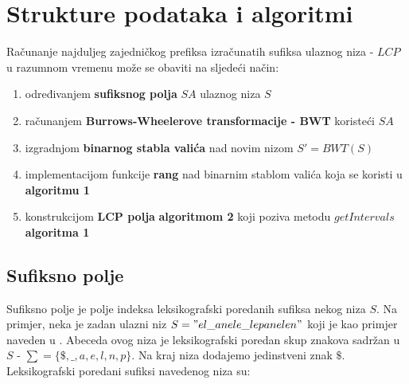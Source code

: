 \documentclass[times, utf8, seminar, numeric]{fer}
\begin{document}
\chapter{Strukture podataka i algoritmi}
Računanje najduljeg zajedničkog prefiksa izračunatih sufiksa ulaznog niza - $LCP$ u razumnom vremenu može se obaviti na sljedeći način:

\begin{center}
	\begin{enumerate}
		\setlength\itemsep{-0.8em}
		\item {određivanjem \textbf{sufiksnog polja} $SA$ ulaznog niza $S$}
		\item {računanjem \textbf{Burrows-Wheelerove transformacije - BWT} koristeći $SA$}
		\item {izgradnjom \textbf{binarnog stabla valića} nad novim nizom $S'= BWT(S)$}
		\item {implementacijom funkcije \textbf{rang} nad binarnim stablom valića koja se koristi u \textbf{algoritmu 1}}
		\item {konstrukcijom \textbf{LCP polja} \textbf{algoritmom 2} koji poziva metodu $getIntervals$ \textbf{algoritma 1}}
	\end{enumerate} 
\end{center}


\section {Sufiksno polje}
Sufiksno polje je polje indeksa leksikografski poredanih sufiksa nekog niza $S$. Na primjer, neka je zadan ulazni niz $S = "el\_anele\_lepanelen"$ koji je kao primjer naveden u \cite{Beller2011}. Abeceda ovog niza je leksikografski poredan skup znakova sadržan u $S$ - $\sum = \{\$, \_, a, e, l, n, p\}$. Na kraj niza dodajemo jedinstveni znak $\$$. Leksikografski poredani sufiksi navedenog niza su:
\end{document}
